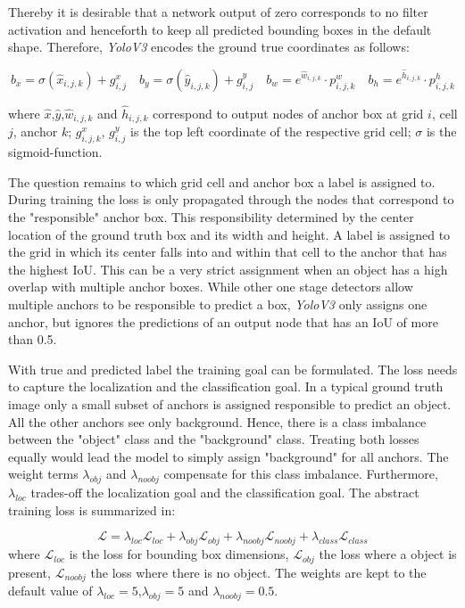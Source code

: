 Thereby it is desirable that a network output of zero corresponds to no filter activation and henceforth to keep all predicted bounding boxes in the default shape. Therefore, \textit{YoloV3} encodes the ground true coordinates as follows:

\begin{equation}
\label{sec:encoding}
b_x = \sigma(\hat x_{i,j,k}) + g^x_{i,j}\quad
b_y = \sigma(\hat y_{i,j,k}) + g^y_{i,j}\quad
b_w = e^{\hat w_{i,j,k}} \cdot p^w_{i,j,k}\quad
b_h = e^{\hat h_{i,j,k}} \cdot p^h_{i,j,k}
\end{equation}

where $\hat{x}$,$\hat{y}$,$\hat w_{i,j,k}$ and $\hat h_{i,j,k}$ correspond to output nodes of anchor box at grid $i$, cell $j$, anchor $k$; $g^x_{i,j,k}$, $g^y_{i,j}$ is the top left coordinate of the respective grid cell; $\sigma$ is the sigmoid-function.

The question remains to which grid cell and anchor box a label is assigned to. During training the loss is only propagated through the nodes that correspond to the "responsible" anchor box. This responsibility determined by the center location of the ground truth box and its width and height. A label is assigned to the grid in which its center falls into and within that cell to the anchor that has the highest \ac{IoU}. This can be a very strict assignment when an object has a high overlap with multiple anchor boxes. While other one stage detectors allow multiple anchors to be responsible to predict a box, \textit{YoloV3} only assigns one anchor, but ignores the predictions of an output node that has an \ac{IoU} of more than 0.5.

With true and predicted label the training goal can be formulated. The loss needs to capture the localization and the classification goal. In a typical ground truth image only a small subset of anchors is assigned responsible to predict an object. All the other anchors see only background. Hence, there is a class imbalance between the "object" class and the "background" class. Treating both losses equally would lead the model to simply assign "background" for all anchors. The weight terms $\lambda_{obj}$ and $\lambda_{noobj}$ compensate for this class imbalance. Furthermore, $\lambda_{loc}$ trades-off the localization goal and the classification goal. The abstract training loss is summarized in: 

\begin{equation}
\mathcal{L} = \lambda_{loc}\mathcal{L}_{loc} + \lambda_{obj}\mathcal{L}_{obj} + \lambda_{noobj}\mathcal{L}_{noobj} + \lambda_{class}\mathcal{L}_{class}
\end{equation}
where $\mathcal{L}_{loc}$ is the loss for bounding box dimensions, $\mathcal{L}_{obj}$ the loss where a object is present, $\mathcal{L}_{noobj}$ the loss where there is no object. The weights are kept to the default value of $\lambda_{loc} = 5$,$\lambda_{obj} = 5$ and $\lambda_{noobj} = 0.5$.

